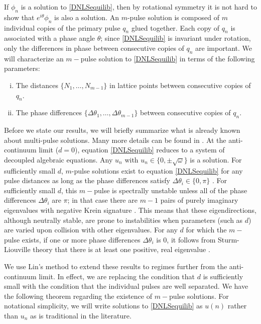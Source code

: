 \documentclass[thesis.tex]{subfiles}
\begin{document}
If $\phi_n$ is a solution to \cref{DNLSequilib}, then by rotational symmetry it is not hard to show that $e^{i \theta} \phi_n$ is also a solution. An $m$-pulse solution is composed of $m$ individual copies of the primary pulse $q_n$ glued together. Each copy of $q_n$ is associated with a phase angle $\theta$; since \cref{DNLSequilib} is invariant under rotation, only the differences in phase between consecutive copies of $q_n$ are important. We will characterize an $m-$pulse solution to \cref{DNLSequilib} in terms of the following parameters: 
\begin{enumerate}[(i)]
\item The distances $\{ N_1, \dots, N_{m-1} \}$ in lattice points between consecutive copies of $q_n$.
\item The phase differences $\{ \Delta\theta_1, \dots, \Delta\theta_{m-1} \}$ between consecutive copies of $q_n$.
\end{enumerate}

Before we state our results, we will briefly summarize what is already known about multi-pulse solutions. Many more details can be found in \cite{Kevrekidis2009,pelinovsky_2011}. At the anti-continuum limit ($d = 0$), equation \cref{DNLSequilib} reduces to a system of decoupled algebraic equations. Any $u_n$ with $u_n \in \{ 0, \pm \sqrt{\omega}\}$ is a solution. For sufficiently small $d$, $m$-pulse solutions exist to equation \cref{DNLSequilib} for any pulse distances as long as the phase differences satisfy $\Delta \theta_i \in \{0, \pi\}$ \cite[Proposition 2.1]{Pelinovsky2005}. For sufficiently small $d$, this $m-$pulse is spectrally unstable unless all of the phase differences $\Delta \theta_i$ are $\pi$; in that case there are $m-1$ pairs of purely imaginary eigenvalues with negative Krein signature \cite[Theorem 3.6]{Pelinovsky2005}. This means that these eigendirections, although neutrally stable, are prone to instabilities when parameters (such as $d$) are varied upon collision with other eigenvalues. For any $d$ for which the $m-$pulse exists, if one or more phase differences $\Delta \theta_i$ is 0, it follows from Sturm-Liouville theory that there is at least one positive, real eigenvalue \cite{Kapitula2001a}.

We use Lin's method to extend these results to regimes further from the anti-continuum limit. In effect, we are replacing the condition that $d$ is sufficiently small with the condition that the individual pulses are well separated. We have the following theorem regarding the existence of $m-$pulse solutions. For notational simplicity, we will write solutions to \cref{DNLSequilib} as $u(n)$ rather than $u_n$ as is traditional in the literature.
\end{document}
